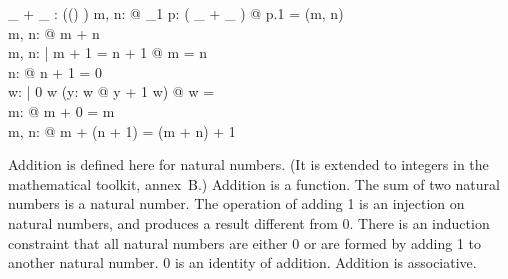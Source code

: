 \documentclass{article}
\begin{document}
\begin{axdef}
\_ + \_ : \power ((\arithmos \cross \arithmos) \cross \arithmos)
\where
\forall m, n: \nat @ \exists_1 p: ( \_ + \_ ) @ p.1 = (m, n)\\
\forall m, n: \nat @ m + n \in \nat\\
\forall m, n: \nat | m + 1 = n + 1 @ m = n\\
\forall n: \nat @ \lnot n + 1 = 0\\
\forall w: \power \nat | 0 \in w \land (\forall y: w @ y + 1 \in w) @ w = \nat\\
\forall m: \nat @ m + 0 = m\\
\forall m, n: \nat @ m + (n + 1) = (m + n) + 1
\end{axdef}

Addition is defined here for natural numbers.
(It is extended to integers in the mathematical toolkit,
annex~B.)
Addition is a function.
The sum of two natural numbers is a natural number.
The operation of adding 1 is an injection on natural numbers,
and produces a result different from 0.
There is an induction constraint that all natural numbers are
either 0 or are formed by adding 1 to another natural number.
0 is an identity of addition.
Addition is associative.

\end{document}
